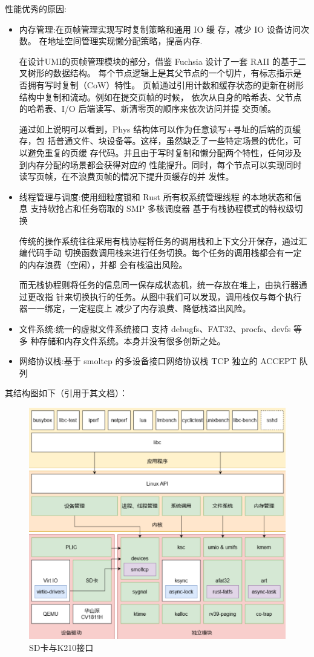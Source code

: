 性能优秀的原因:
\begin{itemize}
    \item 内存管理:在页帧管理实现写时复制策略和通用 IO 缓
存，减少 IO 设备访问次数。
在地址空间管理实现懒分配策略，提高内存.

在设计UMI的页帧管理模块的部分，借鉴 Fuchsia 设计了一套 RAII 的基于二叉树形的数据结构。
每个节点逻辑上是其父节点的一个切片，有标志指示是否拥有写时复制（CoW）特性。
页帧通过引用计数和缓存状态的更新在树形结构中复制和流动。例如在提交页帧的时候，
依次从自身的哈希表、父节点的哈希表、I/O 后端读写、新清零页的顺序来依次访问并提
交页帧。

通过如上说明可以看到，Phys 结构体可以作为任意读写+寻址的后端的页缓存，包
括普通文件、块设备等。这样，虽然缺乏了一些特定场景的优化，可以避免重复的页缓
存代码。并且由于写时复制和懒分配两个特性，任何涉及到内存分配的场景都会获得对应的
性能提升。同时，每个节点可以实现同时读写页帧，在不浪费页帧的情况下提升页缓存的并
发性。
    \item 线程管理与调度:使用细粒度锁和 Rust 所有权系统管理线程
的本地状态和信息
支持软抢占和任务窃取的 SMP 多核调度器
基于有栈协程模式的特权级切换

传统的操作系统往往采用有栈协程将任务的调用栈和上下文分开保存，通过汇编代码手动
切换函数调用栈来进行任务切换。每个任务的调用栈都会有一定的内存浪费（空闲），并都
会有栈溢出风险。

而无栈协程则将任务的信息同一保存成状态机，统一存放在堆上，由执行器通过更改指
针来切换执行的任务。从图中我们可以发现，调用栈仅与每个执行器一一绑定，一定程度上
减少了内存浪费、降低栈溢出风险。

    \item 文件系统:统一的虚拟文件系统接口
支持 debugfs、FAT32、procfs、devfs 等多
种存储和内存文件系统。本身并没有很多创新之处。
    \item 网络协议栈:基于 smoltcp 的多设备接口网络协议栈
TCP 独立的 ACCEPT 队列
\end{itemize}

其结构图如下（引用于其文档）：
\begin{figure}[H]
    \centering
    \includegraphics{figures/10-03-plntry.png}
    \caption{SD卡与K210接口}
\end{figure}

